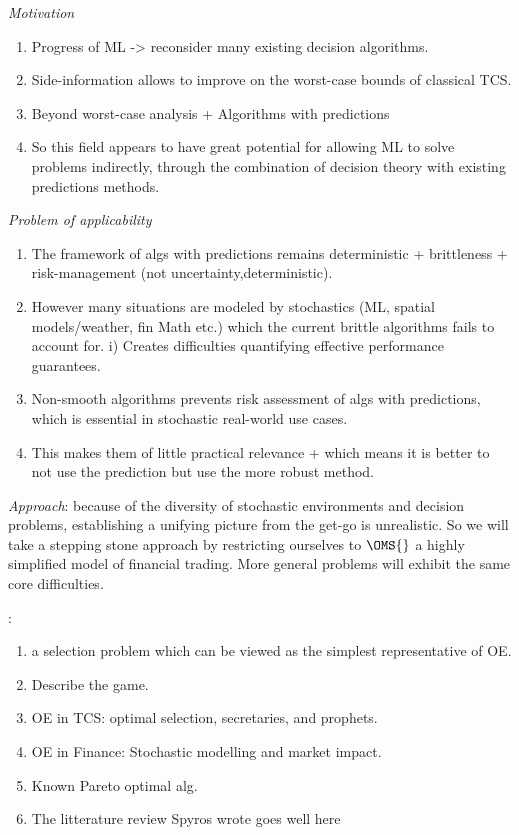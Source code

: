 \vspace{1cm}




\textit{Motivation}
\begin{enumerate}
    \item Progress of ML -> reconsider many existing decision algorithms.
    \item Side-information allows to improve on the worst-case bounds of classical TCS.
    \item Beyond worst-case analysis + Algorithms with predictions 
    \item So this field appears to have great potential for allowing ML to solve problems indirectly, through the combination of decision theory with existing predictions methods.
\end{enumerate}

\textit{Problem of applicability}
\begin{enumerate}
    \item The framework of algs with predictions remains deterministic + brittleness + risk-management (not uncertainty,deterministic).
    \item However many situations are modeled by stochastics (ML, spatial models/weather, fin Math etc.) which the current brittle algorithms fails to account for.
     i) Creates difficulties quantifying effective performance guarantees.
     \item Non-smooth algorithms prevents risk assessment of algs with predictions, which is essential in stochastic real-world use cases.
     \item This makes them of little practical relevance + which means it is better to not use the prediction but use the more robust method.
\end{enumerate}

\textit{Approach}: because of the diversity of stochastic environments and decision problems, establishing a unifying picture from the get-go is unrealistic. So we will take a stepping stone approach by restricting ourselves to $\OMS{}$ a highly simplified model of financial trading.  More general problems will exhibit the same core difficulties.


\textit{{\OMS{}}}:
\begin{enumerate} 
    \item a selection problem which can be viewed as the simplest representative of OE.
    \item Describe the game.
    \item OE in TCS: optimal selection, secretaries, and prophets. 
    \item OE in Finance: Stochastic modelling and market impact.
    \item Known Pareto optimal alg.
    \item The litterature review Spyros wrote goes well here
\end{enumerate}


